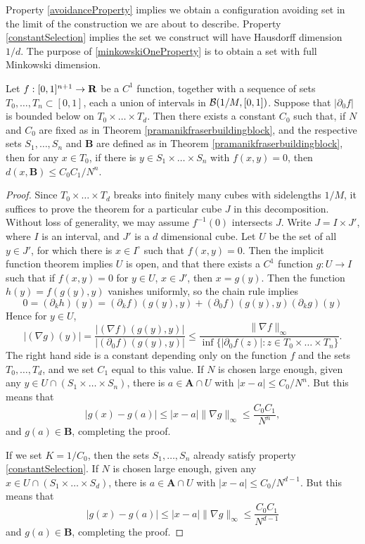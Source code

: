 \begin{remark}
    Property \ref{avoidanceProperty} implies we obtain a configuration avoiding set in the limit of the construction we are about to describe. Property \ref{constantSelection} implies the set we construct will have Hausdorff dimension $1/d$. The purpose of \ref{minkowskiOneProperty} is to obtain a set with full Minkowski dimension.
\end{remark}

\begin{lemma}
    Let $f: [0,1]^{n+1} \to \operatorname{\mathbf{R}}$ be a $C^1$ function, together with a sequence of sets $T_0, \dots, T_n \subset [0,1]$, each a union of intervals in $\operatorname{\mathcal{B}}(1/M,[0,1])$. Suppose that $|\partial_0 f|$ is bounded below on $T_0 \times \dots \times T_d$. Then there exists a constant $C_0$ such that, if $N$ and $C_0$ are fixed as in Theorem \ref{pramanikfraserbuildingblock}, and the respective sets $S_1, \dots, S_n$ and $\mathbf{B}$ are defined as in Theorem \ref{pramanikfraserbuildingblock}, then for any $x \in T_0$, if there is $y \in S_1 \times \dots \times S_n$ with $f(x,y) = 0$, then $d(x, \mathbf{B}) \leq C_0C_1/N^n$.
\end{lemma}
\begin{proof}
    Since $T_0 \times \dots \times T_d$ breaks into finitely many cubes with sidelengths $1/M$, it suffices to prove the theorem for a particular cube $J$ in this decomposition. Without loss of generality, we may assume $f^{-1}(0)$ intersects $J$. Write $J = I \times J'$, where $I$ is an interval, and $J'$ is a $d$ dimensional cube. Let $U$ be the set of all $y \in J'$, for which there is $x \in I^\circ$ such that $f(x,y) = 0$. Then the implicit function theorem implies $U$ is open, and that there exists a $C^1$ function $g: U \to I$ such that if $f(x,y) = 0$ for $y \in U$, $x \in J'$, then $x = g(y)$. Then the function $h(y) = f(g(y),y)$ vanishes uniformly, so the chain rule implies
    \[ 0 = (\partial_k h)(y) = (\partial_k f) (g(y),y) + (\partial_0 f) (g(y),y) (\partial_k g)(y) \]
    Hence for $y \in U$,
    \[ |(\nabla g)(y)| = \frac{|(\nabla f)(g(y),y)|}{|(\partial_0 f)(g(y),y)|} \leq \frac{\| \nabla f \|_{\infty}}{\inf \{ |\partial_0 f(z)| : z \in T_0 \times \dots \times T_n \}}. \]
    The right hand side is a constant depending only on the function $f$ and the sets $T_0, \dots, T_d$, and we set $C_1$ equal to this value. If $N$ is chosen large enough, given any $y \in U \cap (S_1 \times \dots \times S_n)$, there is $a \in \mathbf{A} \cap U$ with $|x - a| \leq C_0/N^n$. But this means that
    \[ |g(x) - g(a)| \leq |x - a| \| \nabla g \|_\infty \leq \frac{C_0 C_1}{N^n}, \]
    and $g(a) \in \mathbf{B}$, completing the proof.

    If we set $K = 1/C_0$, then the sets $S_1, \dots, S_n$ already satisfy property \ref{constantSelection}.
    If $N$ is chosen large enough, given any $x \in U \cap (S_1 \times \dots \times S_d)$, there is $a \in \mathbf{A} \cap U$ with $|x - a| \leq C_0/N^{d-1}$. But this means that
    \[ |g(x) - g(a)| \leq |x - a| \| \nabla g \|_\infty \leq \frac{C_0 C_1}{N^{d-1}} \]
    and $g(a) \in \mathbf{B}$, completing the proof.
\end{proof}

